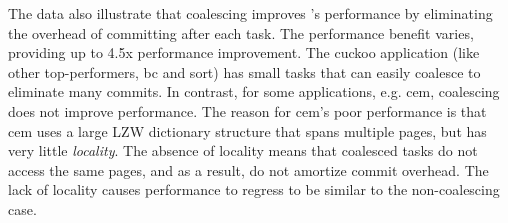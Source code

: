 The data also illustrate that coalescing improves \sys's performance by eliminating the overhead of committing after each task. The performance benefit varies, providing up to 4.5x performance improvement. The cuckoo application (like other top-performers, bc and sort) has small tasks that \sys can easily coalesce to eliminate many commits. In contrast, for some applications, e.g. cem, coalescing does not improve performance. The reason for cem's poor performance is that cem uses a large LZW dictionary structure that spans multiple pages, but has very little {\em locality}. The absence of locality means that coalesced tasks do not access the same pages, and as a result, do not amortize commit overhead. The lack of locality causes performance to regress to be similar to the non-coalescing case. 




